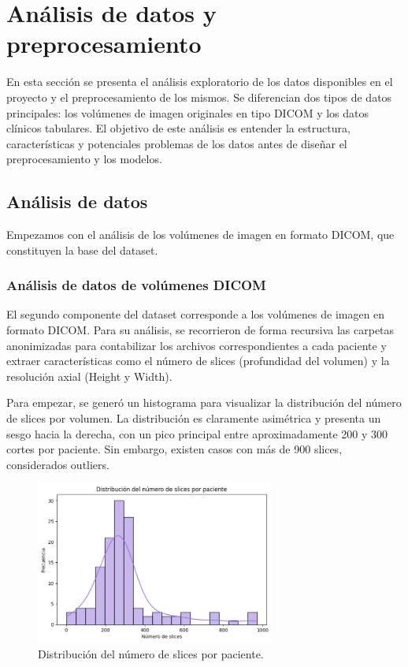 
\chapter{Análisis de datos y preprocesamiento} \label{eda}

En esta sección se presenta el análisis exploratorio de los datos disponibles en el proyecto y el preprocesamiento de los mismos. Se diferencian dos tipos de datos principales: los volúmenes de imagen originales en tipo DICOM y los datos clínicos tabulares. El objetivo de este análisis es entender la estructura, características y potenciales problemas de los datos antes de diseñar el preprocesamiento y los modelos.

\section{Análisis de datos}
Empezamos con el análisis de los volúmenes de imagen en formato DICOM, que constituyen la base del dataset.
\subsection{Análisis de datos de volúmenes DICOM}
El segundo componente del dataset corresponde a los volúmenes de imagen en formato DICOM. Para su análisis, se recorrieron de forma recursiva las carpetas anonimizadas para contabilizar los archivos correspondientes a cada paciente y extraer características como el número de slices (profundidad del volumen) y la resolución axial (Height y Width).

Para empezar, se generó un histograma para visualizar la distribución del número de slices por volumen. La distribución es claramente asimétrica y presenta un sesgo hacia la derecha, con un pico principal entre aproximadamente 200 y 300 cortes por paciente. Sin embargo, existen casos con más de 900 slices, considerados outliers.


\begin{figure}[!htbp]
    \centering
    \includegraphics[width=0.7\textwidth]{img/histograma_dist_slices_x_paciente.png}
    \caption{Distribución del número de slices por paciente.}
    \label{fig:distribucion_slices}
\end{figure}

